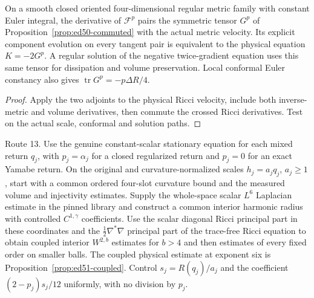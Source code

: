 \begin{proposition}
\label{prob:ed06-original-variation}
\leanok
On a smooth closed oriented four-dimensional regular metric family with
constant Euler integral, the derivative of $\mathcal F^p$ pairs the
symmetric tensor $G^p$ of Proposition~\ref{prop:ed50-commuted} with
the actual metric velocity. Its explicit component evolution on every tangent
pair is equivalent to the physical equation $K=-2G^p$. A regular
solution of the negative twice-gradient equation uses this same tensor
for dissipation and volume preservation. Local conformal Euler constancy
also gives $\operatorname{tr}G^p=-p\Delta R/4$.
\end{proposition}
\begin{proof}
\leanok
Apply the two adjoints to the physical Ricci velocity, include both
inverse-metric and volume derivatives, then commute the crossed Ricci
derivatives. Test on the actual scale, conformal and solution paths.
\end{proof}

\begin{openproblem}
\label{prob:ed06-stationary-interior}
Route 13. Use the genuine constant-scalar stationary equation for each
mixed return $q_j$, with $p_j=\alpha_j$ for a closed regularized return
and $p_j=0$ for an exact Yamabe return. On the original and
curvature-normalized scales $h_j=a_jq_j$, $a_j\ge1$, start with a common
ordered four-slot curvature bound and the measured volume and injectivity
estimates. Supply the whole-space scalar $L^6$ Laplacian estimate in the pinned library and construct a common interior harmonic radius with controlled
$C^{1,\gamma}$ coefficients. Use the scalar diagonal Ricci principal
part in these coordinates and the $\tfrac12\nabla^*\nabla$ principal
part of the trace-free Ricci equation to obtain coupled interior
$W^{2,b}$ estimates for $b>4$ and then estimates of every fixed order
on smaller balls. The coupled physical estimate at exponent six is Proposition~\ref{prop:ed51-coupled}. Control $s_j=R(q_j)/a_j$ and the coefficient
$(2-p_j)s_j/12$ uniformly, with no division by $p_j$.
\end{openproblem}

